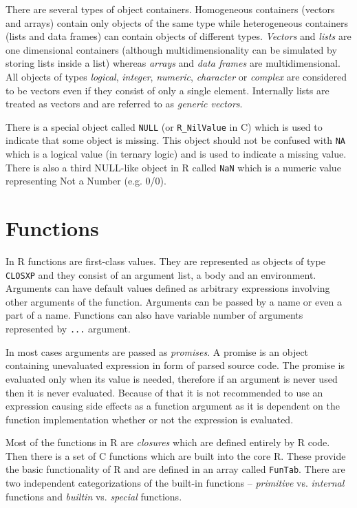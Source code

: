 \documentclass[thesis=M,english,hidelinks]{FITthesis}[2012/10/20]
\begin{document}
	There are several types of object containers. Homogeneous containers (vectors and arrays) contain only objects of the same type while heterogeneous containers (lists and data frames) can contain objects of different types. \emph{Vectors} and \emph{lists} are one dimensional containers (although multidimensionality can be simulated by storing lists inside a list) whereas \emph{arrays} and \emph{data frames} are multidimensional. All objects of types \emph{logical}, \emph{integer}, \emph{numeric}, \emph{character} or \emph{complex} are considered to be vectors even if they consist of only a single element. Internally lists are treated as vectors and are referred to as \emph{generic vectors}.\par
	
	There is a special object called \lstinline|NULL| (or \lstinline|R_NilValue| in C) which is used to indicate that some object is missing. This object should not be confused with \lstinline|NA| which is a logical value (in ternary logic) and is used to indicate a missing value. There is also a third NULL-like object in R called \lstinline{NaN} which is a numeric value representing Not a Number (e.g. 0/0).\par
	
	\section{Functions}
	In R functions are first-class values. They are represented as objects of type \lstinline|CLOSXP| and they consist of an argument list, a body and an environment. Arguments can have default values defined as arbitrary expressions involving other arguments of the function. Arguments can be passed by a name or even a part of a name. Functions can also have variable number of arguments represented by \lstinline|...| argument.\par
	
	In most cases arguments are passed as \emph{promises}. A promise is an object containing unevaluated expression in form of parsed source code. The promise is evaluated only when its value is needed, therefore if an argument is never used then it is never evaluated. Because of that it is not recommended to use an expression causing side effects as a function argument as it is dependent on the function implementation whether or not the expression is evaluated.\par
	
	Most of the functions in R are \emph{closures} which are defined entirely by R code. Then there is a set of C functions which are built into the core R. These provide the basic functionality of R and are defined in an array called \lstinline|FunTab|. There are two independent categorizations of the built-in functions -- \emph{primitive} vs. \emph{internal} functions and \emph{builtin} vs. \emph{special} functions.\par
	
\end{document}
